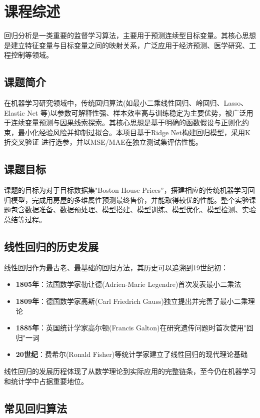 \section{课程综述}

回归分析是一类重要的监督学习算法，主要用于预测连续型目标变量。其核心思想是建立特征变量与目标变量之间的映射关系，广泛应用于经济预测、医学研究、工程控制等领域。
\subsection{课题简介}
在机器学习研究领域中，传统回归算法(如最小二乘线性回归、岭回归、Lasso、Elastic Net 等)以参数可解释性强、样本效率高与训练稳定为主要优势，被广泛用于连续变量预测与因果线索探索。其核心思想是基于明确的函数假设与正则化约束，最小化经验风险并抑制过拟合。本项目基于Ridge Net构建回归模型，采用K折交叉验证 进行选参，并以MSE/MAE在独立测试集评估性能。
\subsection{课题目标}
课题的目标为对于目标数据集"Boston House Prices”，搭建相应的传统机器学习回归模型，完成用房屋的多维属性预测最终售价，并能取得较优的性能。整个实验课题包含数据准备、数据预处理、模型搭建、模型训练、模型优化、模型检测、实验总结等过程。
\subsection{线性回归的历史发展}

线性回归作为最古老、最基础的回归方法，其历史可以追溯到19世纪初：

\begin{itemize}
    \item \textbf{1805年}：法国数学家勒让德(Adrien-Marie Legendre)首次发表最小二乘法
    \item \textbf{1809年}：德国数学家高斯(Carl Friedrich Gauss)独立提出并完善了最小二乘理论
    \item \textbf{1885年}：英国统计学家高尔顿(Francis Galton)在研究遗传问题时首次使用"回归"一词
    \item \textbf{20世纪}：费希尔(Ronald Fisher)等统计学家建立了线性回归的现代理论基础
\end{itemize}

线性回归的发展历程体现了从数学理论到实际应用的完整链条，至今仍在机器学习和统计学中占据重要地位。

\subsection{常见回归算法}

